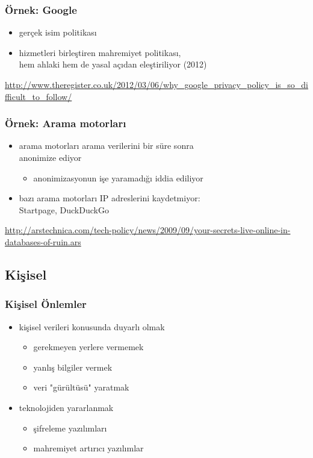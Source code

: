 \documentclass[dvipsnames]{beamer}
\theoremstyle{definition}
\theoremstyle{example}
\theoremstyle{plain}
\begin{document}
\begin{frame}
  \frametitle{Örnek: Google}

  \begin{itemize}
    \item gerçek isim politikası
    \item hizmetleri birleştiren mahremiyet politikası,\\
      hem ahlaki hem de yasal açıdan eleştiriliyor (2012)
  \end{itemize}

  \medskip
  \tiny{\url{http://www.theregister.co.uk/2012/03/06/why_google_privacy_policy_is_so_difficult_to_follow/}}\\
\end{frame}

\begin{frame}
  \frametitle{Örnek: Arama motorları}

  \begin{itemize}
    \item arama motorları arama verilerini bir süre sonra\\
      anonimize ediyor
    \begin{itemize}
      \item anonimizasyonun işe yaramadığı iddia ediliyor
    \end{itemize}

    \medskip
    \item bazı arama motorları IP adreslerini kaydetmiyor:\\
      Startpage, DuckDuckGo
  \end{itemize}

  \medskip
  \tiny{\url{http://arstechnica.com/tech-policy/news/2009/09/your-secrets-live-online-in-databases-of-ruin.ars}}\\
\end{frame}

\subsection{Kişisel}

\begin{frame}
  \frametitle{Kişisel Önlemler}

  \begin{itemize}
    \item kişisel verileri konusunda duyarlı olmak
    \begin{itemize}
      \item gerekmeyen yerlere vermemek
      \item yanlış bilgiler vermek
      \item veri "gürültüsü" yaratmak
    \end{itemize}

    \pause
    \medskip
    \item teknolojiden yararlanmak
    \begin{itemize}
      \item şifreleme yazılımları
      \item mahremiyet artırıcı yazılımlar
    \end{itemize}
  \end{itemize}
\end{frame}
\end{document}
